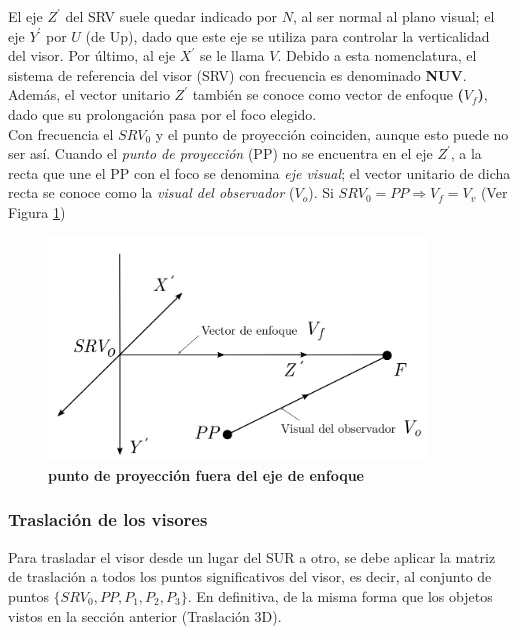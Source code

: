 El eje $Z^{\prime}$ del SRV suele quedar indicado por $N$, al ser normal al plano visual; el eje $Y^{\prime}$ por $U$ (de Up), dado que este eje se utiliza para controlar la verticalidad del visor. Por último, al eje $X^{\prime}$ se le llama $V$. Debido a esta nomenclatura, el sistema de referencia del visor (SRV) con frecuencia es denominado \textbf{NUV}. Además, el vector unitario $Z^{\prime}$ también se conoce como vector de enfoque \textbf{($V_f$)}, dado que su prolongación pasa por el foco elegido.\\
Con frecuencia el $SRV_0$ y el punto de proyección coinciden, aunque esto puede no ser así. Cuando el \textit{punto de proyección} (PP) no se encuentra en el eje $Z^{\prime}$, a la recta que une el PP con el foco se denomina \textit{eje visual}; el vector unitario de dicha recta se conoce como la \textit{visual del observador} ($V_o$). Si $SRV_0 = PP {\Rightarrow} V_f = V_v$ (Ver Figura  \ref{geo-visor3})

\begin{figure}[h]
\includegraphics[width=10cm]{Img/GEO/geo-visor-3.png}
\centering
    \caption{\footnotesize{\textbf{punto de proyección fuera del eje de enfoque}}}
    \label{geo-visor3}
\end{figure}

\clearpage
\subsubsection{Traslación de los visores}
Para trasladar el visor desde un lugar del SUR a otro, se debe aplicar la matriz de traslación a todos los puntos significativos del visor, es decir, al conjunto de puntos $\{SRV_0, PP, P_1, P_2, P_3\}$. En definitiva, de la misma forma que los objetos vistos en la sección anterior (Traslación 3D).

